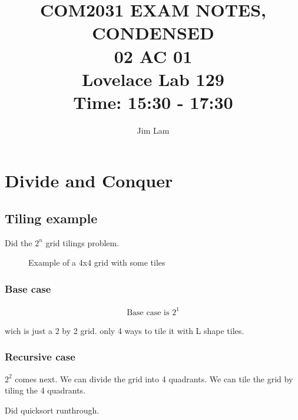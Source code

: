 \documentclass{article}
\author{Jim Lam}
\begin{document}
\title{%
    COM2031 EXAM NOTES, CONDENSED \\
    \large 02 AC 01 \\
    Lovelace Lab 129 \\
    Time: 15:30 - 17:30 \\
    }
\maketitle
\tableofcontents
\section{Divide and Conquer}

\subsection{Tiling example}
Did the $ 2^{n}$ grid tilings problem.

\begin{figure}[htbp]
    \centering
    \caption{Example of a 4x4 grid with some tiles}
\end{figure}

\subsubsection{Base case}

\begin{align*}
    \text{Base case is } 2^{1}
\end{align*}

wich is just a 2 by 2 grid. only 4 ways to tile it with L shape tiles.

\subsubsection{Recursive case}

$ 2^2 $ comes next. We can divide the grid into 4 quadrants. We can tile the grid by tiling the 4 quadrants.

Did quicksort runthrough.
\end{document}
